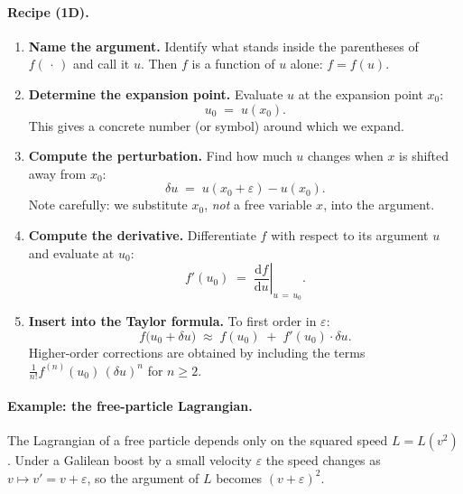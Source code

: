 \paragraph{Recipe (1D).}
\begin{enumerate}
	\item \textbf{Name the argument.}
	Identify what stands inside the parentheses of $f(\,\cdot\,)$ and
	call it $u$.  Then $f$ is a function of $u$ alone: $f = f(u)$.
	
	\item \textbf{Determine the expansion point.}
	Evaluate $u$ at the expansion point $x_0$:
	\begin{equation}
		u_0 \;=\; u(x_0).
	\end{equation}
	This gives a concrete number (or symbol) around which we expand.
	
	\item \textbf{Compute the perturbation.}
	Find how much $u$ changes when $x$ is shifted away from $x_0$:
	\begin{equation}
		\delta u \;=\; u(x_0 + \varepsilon) - u(x_0).
	\end{equation}
	Note carefully: we substitute $x_0$, \emph{not} a free variable $x$,
	into the argument.
	
	\item \textbf{Compute the derivative.}
	Differentiate $f$ with respect to its argument $u$ and evaluate at
	$u_0$:
	\begin{equation}
		f'(u_0) \;=\; \left.\frac{\mathrm{d}f}{\mathrm{d}u}\right|_{u\,=\,u_0}.
	\end{equation}
	
	\item \textbf{Insert into the Taylor formula.}
	To first order in $\varepsilon$:
	\begin{equation}
		\boxed{f\bigl(u_0 + \delta u\bigr)
			\;\approx\; f(u_0) \;+\; f'(u_0)\cdot\delta u.}
		\label{eq:taylor1d}
	\end{equation}
	Higher-order corrections are obtained by including the terms
	$\tfrac{1}{n!}f^{(n)}(u_0)\,(\delta u)^n$ for $n \geq 2$.
\end{enumerate}

\paragraph{Example: the free-particle Lagrangian.}
The Lagrangian of a free particle depends only on the squared speed
$L = L(v^2)$.  Under a Galilean boost by a small velocity $\varepsilon$ the
speed changes as $v \mapsto v' = v + \varepsilon$, so the argument of $L$
becomes $(v+\varepsilon)^2$.

